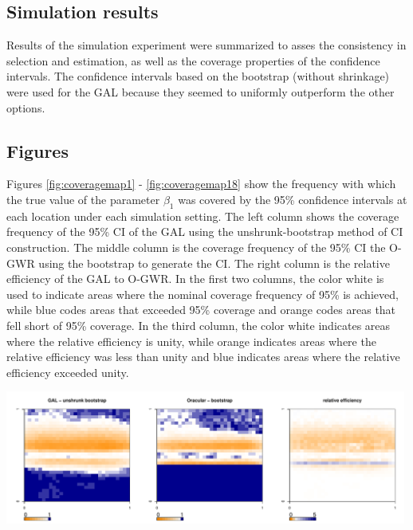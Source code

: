 \documentclass[authoryear, review, 11pt]{elsarticle}
\begin{document}
	\subsection{Simulation results}
	Results of the simulation experiment were summarized to asses the consistency in selection and estimation, as well as the coverage properties of the confidence intervals. The confidence intervals based on the bootstrap (without shrinkage) were used for the GAL because they seemed to uniformly outperform the other options.\\
	
	\subsection{Figures}
	Figures \ref{fig:coveragemap1} - \ref{fig:coveragemap18} show the frequency with which the true value of the parameter $\beta_1$ was covered by the 95\% confidence intervals at each location under each simulation setting. The left column shows the coverage frequency of the 95\% CI of the GAL using the unshrunk-bootstrap method of CI construction. The middle column is the coverage frequency of the 95\% CI the O-GWR using the bootstrap to generate the CI. The right column is the relative efficiency of the GAL to O-GWR. In the first two columns, the color white is used to indicate areas where the nominal coverage frequency of 95\% is achieved, while blue codes areas that exceeded 95\% coverage and orange codes areas that fell short of 95\% coverage. In the third column, the color white indicates areas where the relative efficiency is unity, while orange indicates areas where the relative efficiency was less than unity and blue indicates areas where the relative efficiency exceeded unity.\\	
	
	\begin{center}
		\includegraphics[width=0.99\textwidth]{../../figures/X1-28-1.pdf}
	\end{center}
        
\end{document}
